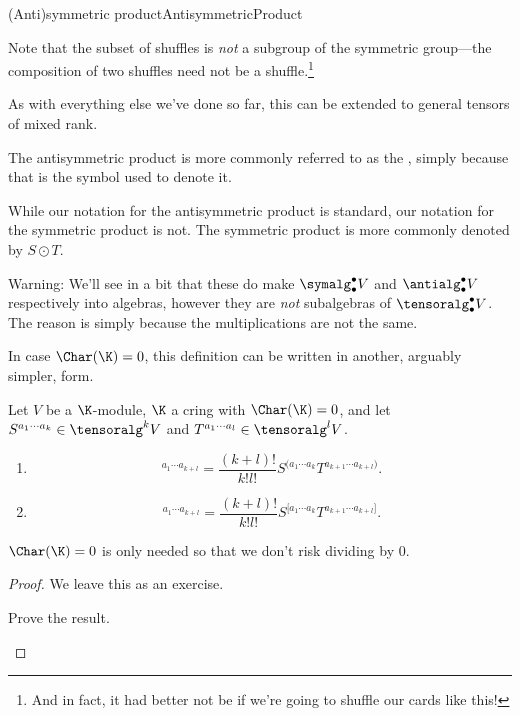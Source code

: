 \begin{dfn}{(Anti)symmetric product}{AntisymmetricProduct}
\begin{rmk}
		Note that the subset of shuffles is \emph{not} a subgroup of the symmetric group---the composition of two shuffles need not be a shuffle.\footnote{And in fact, it had better not be if we're going to shuffle our cards like this!}
	\end{rmk}
	\begin{rmk}
		As with everything else we've done so far, this can be extended to general tensors of mixed rank.
	\end{rmk}
	\begin{rmk}
		The antisymmetric product is more commonly referred to as the , simply because that is the symbol used to denote it.
	\end{rmk}
	\begin{rmk}
		While our notation for the antisymmetric product is standard, our notation for the symmetric product is not.  The symmetric product is more commonly denoted by $S\odot T$\index[notation]{$S\odot T$}.
	\end{rmk}
	\begin{rmk}
		Warning:  We'll see in a bit that these do make $\symalg _{\bullet}^{\bullet}V$ and $\antialg _{\bullet}^{\bullet}V$ respectively into algebras, however they are \emph{not} subalgebras of $\tensoralg _{\bullet}^{\bullet}V$.  The reason is simply because the multiplications are not the same.
	\end{rmk}
\end{dfn}
In case $\Char (\K )=0$, this definition can be written in another, arguably simpler, form.
\begin{prp}{}{}
	Let $V$ be a $\K$-module, $\K$ a cring with $\Char (\K )=0$, and let $S^{a_1\cdots a_k}\in \tensoralg ^kV$ and $T^{a_1\cdots a_l}\in \tensoralg ^lV$.
	\begin{enumerate}
		\item 
		\begin{equation}
			[S\vee T]^{a_1\cdots a_{k+l}}=\frac{(k+l)!}{k!l!}S^{(a_1\cdots a_k}T^{a_{k+1}\cdots a_{k+l})}.
		\end{equation}
		\item
		\begin{equation}
			[S\wedge T]^{a_1\cdots a_{k+l}}=\frac{(k+l)!}{k!l!}S^{[a_1\cdots a_k}T^{a_{k+1}\cdots a_{k+l}]}.
		\end{equation}
	\end{enumerate}
	\begin{rmk}
		$\Char (\K )=0$ is only needed so that we don't risk dividing by $0$.
	\end{rmk}
	\begin{proof}
		We leave this as an exercise.
		\begin{exr}[breakable=false]{}{}
			Prove the result.
		\end{exr}
	\end{proof}
\end{prp}

